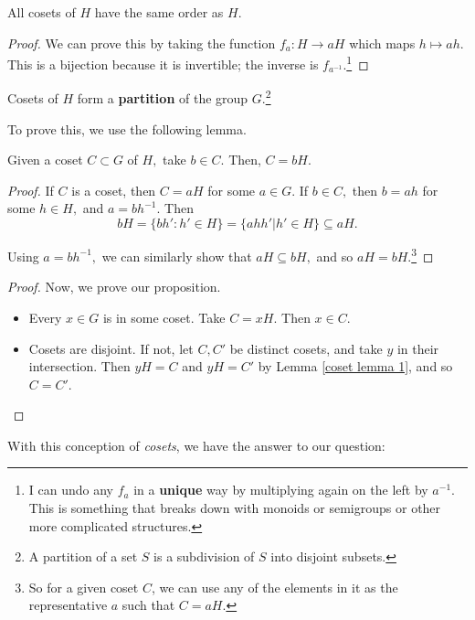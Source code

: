 \begin{proposition}
All cosets of $H$ have the same order as $H.$%
\end{proposition}
\begin{proof}
We can prove this by taking the function $f_a: H \rightarrow aH$ which maps $h \mapsto ah.$ This is a bijection because it is invertible; the inverse is $f_{a^{-1}}.$\footnote{I can undo any $f_a$ in a \textbf{unique} way by multiplying again on the left by $a^{-1}$. This is something that breaks down with monoids or semigroups or other more complicated structures.}
\end{proof}

\begin{proposition}
Cosets of $H$ form a \textbf{partition} of the group $G$.\footnote{A partition of a set $S$ is a subdivision of $S$ into disjoint subsets.}
\end{proposition}


To prove this, we use the following lemma.
\begin{lemma}\label{coset lemma 1}
Given a coset $C \subset G$ of $H,$ take $b \in C.$ Then, $C = bH.$

\end{lemma}
\begin{proof}
If $C$ is a coset, then $C = aH$ for some $a \in G.$ If $b \in C,$ then $b = ah$ for some $h \in H,$ and $a = bh^{-1}.$ Then 
\[
bH = \{bh' : h' \in H\} = \{ahh'| h' \in H\} \subseteq aH.
\]

Using $a = bh^{-1},$ we can similarly show that $aH \subseteq bH,$ and so $aH = bH.$\footnote{So for a given coset $C$, we can use any of the elements in it as the representative $a$ such that $C = aH.$}
\end{proof}
\begin{proof}
Now, we prove our proposition.
\begin{itemize}
    \item Every $x \in G$ is in some coset. Take $C = xH.$ Then $x \in C.$
    \item Cosets are disjoint. If not, let $C, C'$ be distinct cosets, and take $y$ in their intersection. Then $yH = C$ and $yH = C'$ by Lemma \ref{coset lemma 1}, and so $C = C'.$
\end{itemize}
\end{proof}

With this conception of \emph{cosets}, we have the answer to our question:

